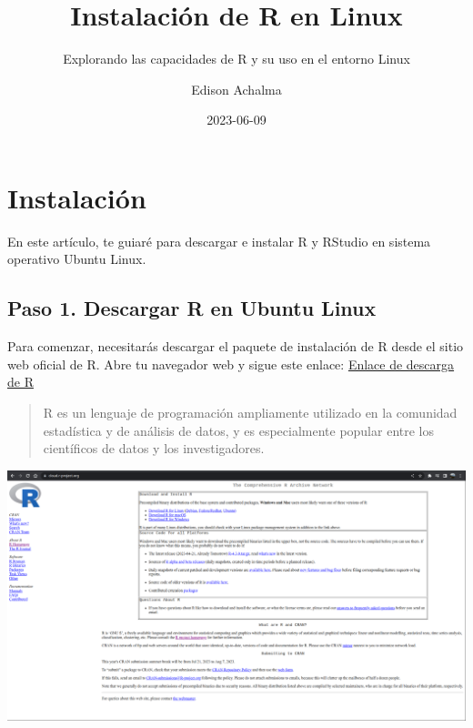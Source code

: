 \documentclass[
  a4paper,
]{article}
\title{Instalación de R en Linux}
\subtitle{Explorando las capacidades de R y su uso en el entorno Linux}
\author{Edison Achalma}
\date{2023-06-09}
\begin{document}
\maketitle
\ifdefined\Shaded\renewenvironment{Shaded}{\begin{tcolorbox}[breakable, enhanced, borderline west={3pt}{0pt}{shadecolor}, boxrule=0pt, interior hidden, frame hidden, sharp corners]}{\end{tcolorbox}}\fi

\hypertarget{instalaciuxf3n}{%
\section{Instalación}\label{instalaciuxf3n}}

En este artículo, te guiaré para descargar e instalar R y RStudio en
sistema operativo Ubuntu Linux.

\hypertarget{paso-1.-descargar-r-en-ubuntu-linux}{%
\subsection{Paso 1. Descargar R en Ubuntu
Linux}\label{paso-1.-descargar-r-en-ubuntu-linux}}

Para comenzar, necesitarás descargar el paquete de instalación de R
desde el sitio web oficial de R. Abre tu navegador web y sigue este
enlace: \href{https://cloud.r-project.org/}{Enlace de descarga de R}

\begin{quote}
R es un lenguaje de programación ampliamente utilizado en la comunidad
estadística y de análisis de datos, y es especialmente popular entre los
científicos de datos y los investigadores.
\end{quote}

\includegraphics{images/Screenshot_20230610_222900.png}
\end{document}
